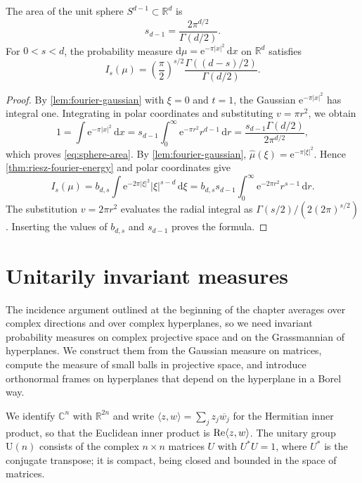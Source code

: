 \begin{example}\label{ex:gaussian-riesz-energy}
The area of the unit sphere $S^{d-1}\subset\mathbb R^d$ is
\begin{equation}\label{eq:sphere-area}
 s_{d-1}=\frac{2\pi^{d/2}}{\Gamma(d/2)}.
\end{equation}
For $0<s<d$, the probability measure $\mathrm d\mu=\mathrm e^{-\pi|x|^2}\,\mathrm d x$ on $\mathbb R^d$ satisfies
\[
 I_s(\mu)=\left(\frac\pi2\right)^{s/2}\frac{\Gamma((d-s)/2)}{\Gamma(d/2)}.
\]
\end{example}
\begin{proof}
By \cref{lem:fourier-gaussian} with $\xi=0$ and $t=1$, the Gaussian $\mathrm e^{-\pi|x|^2}$ has integral one. Integrating in polar coordinates and substituting $v=\pi r^2$, we obtain
\[
 1=\int\mathrm e^{-\pi|x|^2}\,\mathrm d x=s_{d-1}\int_0^\infty\mathrm e^{-\pi r^2}r^{d-1}\,\mathrm d r=\frac{s_{d-1}\Gamma(d/2)}{2\pi^{d/2}},
\]
which proves \eqref{eq:sphere-area}. By \cref{lem:fourier-gaussian}, $\widehat\mu(\xi)=\mathrm e^{-\pi|\xi|^2}$. Hence \cref{thm:riesz-fourier-energy} and polar coordinates give
\[
 I_s(\mu)=b_{d,s}\int\mathrm e^{-2\pi|\xi|^2}|\xi|^{s-d}\,\mathrm d\xi=b_{d,s}s_{d-1}\int_0^\infty\mathrm e^{-2\pi r^2}r^{s-1}\,\mathrm d r.
\]
The substitution $v=2\pi r^2$ evaluates the radial integral as $\Gamma(s/2)/(2(2\pi)^{s/2})$. Inserting the values of $b_{d,s}$ and $s_{d-1}$ proves the formula.
\end{proof}



\section{Unitarily invariant measures}
\label{sec:unitary-measures}
The incidence argument outlined at the beginning of the chapter averages over complex directions and over complex hyperplanes, so we need invariant probability measures on complex projective space and on the Grassmannian of hyperplanes. We construct them from the Gaussian measure on matrices, compute the measure of small balls in projective space, and introduce orthonormal frames on hyperplanes that depend on the hyperplane in a Borel way.

We identify $\mathbb C^n$ with $\mathbb R^{2n}$ and write $\langle z,w\rangle=\sum_jz_j\overline{w_j}$ for the Hermitian inner product, so that the Euclidean inner product is $\operatorname{Re}\langle z,w\rangle$. The unitary group $\mathrm U(n)$ consists of the complex $n\times n$ matrices $U$ with $U^*U=1$, where $U^*$ is the conjugate transpose; it is compact, being closed and bounded in the space of matrices.

